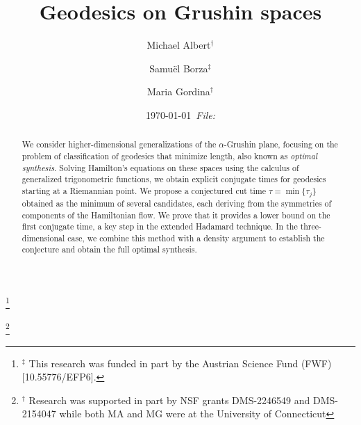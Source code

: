 \documentclass[12pt]{amsart}
\title{Geodesics on Grushin spaces}
\numberwithin{equation}{section}
\theoremstyle{plain}
\theoremstyle{definition}
\theoremstyle{remark}
\begin{document}
\author[Albert]{Michael Albert{$^{\dag }$}}
\address{Department of Mathematics\\
    University of Connecticut\\
    Storrs, CT 06269,  U.S.A.}

\author[Borza]{Samu\"{e}l Borza{$^{\ddag}$}}
\thanks{{$^{\ddag}$}
    This research was funded in part by the Austrian Science Fund (FWF) [10.55776/EFP6].}
\address{Faculty of Mathematics, University of Vienna, Oskar-Morgenstern-Platz 1,
    1090,
    Austria}

\author[Gordina]{Maria Gordina{$^{\dag }$}}
\thanks{{$^{\dag}$} Research was supported in part by NSF grants DMS-2246549 and DMS-2154047 while both MA and MG were at the University of Connecticut}
\address{ Department of Mathematics\\
    University of Rochester\\
    Rochester, NY 14627,  U.S.A.}






\date{\today \ \emph{File:}}

\begin{abstract}
    We consider higher-dimensional generalizations of the $\alpha$-Grushin plane, focusing on the problem of classification of geodesics that minimize length, also known as \textit{optimal synthesis}. Solving Hamilton's equations on these spaces using the calculus of generalized trigonometric functions, we obtain explicit conjugate times for geodesics starting at a Riemannian point. We propose a conjectured cut time $\tau=\min\{\tau_j\}$ obtained as the minimum of several candidates, each deriving from the symmetries of components of the Hamiltonian flow. We prove that it provides a lower bound on the first conjugate time, a key step in the extended Hadamard technique. In the three-dimensional case, we combine this method with a density argument to establish the conjecture and obtain the full optimal synthesis.
\end{abstract}
\end{document}
